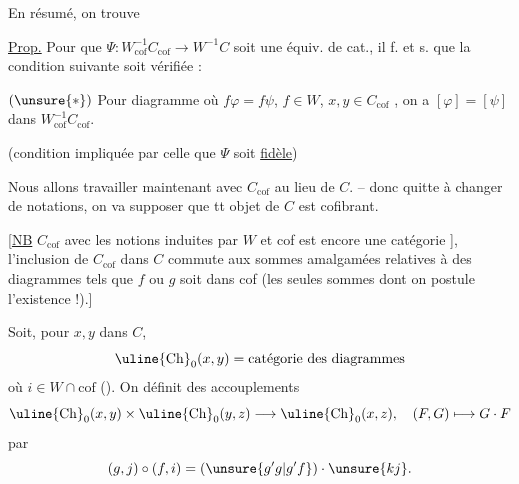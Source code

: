 En résumé, on trouve

\uline{Prop.} Pour que $\Psi:W_{\mathrm{cof}}^{-1}C_{\mathrm{cof}}\longrightarrow W^{-1}C$ soit une équiv. de cat., il f. et s. que la condition suivante soit vérifiée :

$(\unsure{*})$ Pour  diagramme
où $f\varphi=f\psi$, $f\in W$, $x,y\in C_{\mathrm{cof}}$ , on a $[\varphi]=[\psi]$ dans $W_{\mathrm{cof}}^{-1}C_{\mathrm{cof}}$.

(condition impliquée par celle que $\Psi$ soit \uline{fidèle})

Nous allons travailler maintenant avec $C_{\mathrm{cof}}$ au lieu de $C$. -- donc quitte à changer de notations, on va supposer que tt objet de $C$ est cofibrant.

[\uline{NB} $C_{\mathrm{cof}}$ avec les notions induites par $W$ et cof est encore une catégorie ], l'inclusion de $C_{\mathrm{cof}}$ dans $C$ commute aux sommes amalgamées  relatives à des diagrammes
tels que $f$ ou $g$ soit dans cof (les seules sommes dont on postule l'existence !).]

Soit, pour $x,y$ dans $C$,
\[
\uline{\mathrm{Ch}}_0(x,y)=\text{catégorie des diagrammes}
\]
où $i\in W\cap\mathrm{cof}$  (). On définit des accouplements
\[
\uline{\mathrm{Ch}}_0(x,y)\times\uline{\mathrm{Ch}}_0(y,z)\longrightarrow\uline{\mathrm{Ch}}_0(x,z),\quad (F,G)\longmapsto G\mathbin{\cdot}F
\]
par
\[
(g,j)\mathbin{\circ}(f,i)=(\unsure{g'g|g'f})\mathbin{\cdot}\unsure{kj}.
\]
